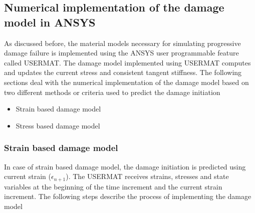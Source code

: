 \documentclass[a4paper,12pt]{extarticle}
\begin{document}
\subsection{Numerical implementation of the damage model in ANSYS}
\indent\indent\indent  As discussed before, the material models necessary for simulating progressive damage failure is implemented using the ANSYS user programmable feature called USERMAT. The damage model implemented using USERMAT computes and updates the current stress and consistent tangent stiffness. The following sections deal with the numerical implementation of the damage model based on two different methods or criteria used to predict the damage initiation\\
\begin{itemize}
\item Strain based damage model 
\item Stress based damage model 
\end{itemize}
\vspace*{1cm}

\newpage
\subsubsection{Strain based damage model}
\indent\indent\indent  In case of strain based damage model, the damage initiation is predicted using current strain ($\epsilon_{n+1}$).   The USERMAT receives strains, stresses and state variables at the beginning of the time increment and the current strain increment. The following steps describe the process of implementing the damage model
\end{document}
